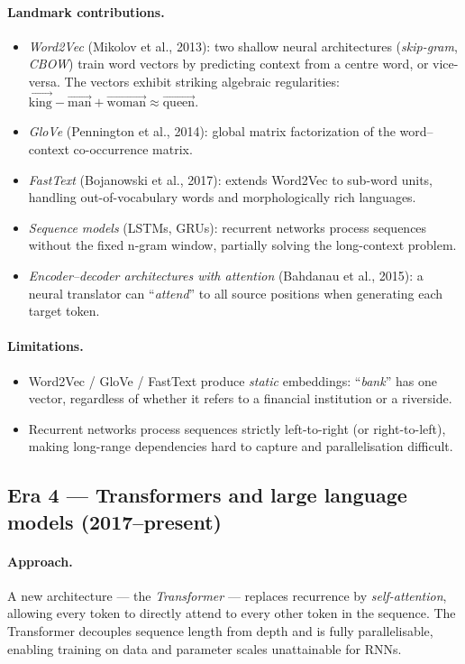 \documentclass[12pt,a4paper]{report}
\theoremstyle{definition}
\theoremstyle{remark}
\begin{document}
\paragraph{Landmark contributions.}
\begin{itemize}
    \item \emph{Word2Vec} (Mikolov et al., 2013): two shallow neural architectures (\emph{skip-gram}, \emph{CBOW}) train word vectors by predicting context from a centre word, or vice-versa. The vectors exhibit striking algebraic regularities: $\overrightarrow{\text{king}} - \overrightarrow{\text{man}} + \overrightarrow{\text{woman}} \approx \overrightarrow{\text{queen}}$.
    \item \emph{GloVe} (Pennington et al., 2014): global matrix factorization of the word--context co-occurrence matrix.
    \item \emph{FastText} (Bojanowski et al., 2017): extends Word2Vec to sub-word units, handling out-of-vocabulary words and morphologically rich languages.
    \item \emph{Sequence models} (LSTMs, GRUs): recurrent networks process sequences without the fixed n-gram window, partially solving the long-context problem.
    \item \emph{Encoder--decoder architectures with attention} (Bahdanau et al., 2015): a neural translator can ``\emph{attend}'' to all source positions when generating each target token.
\end{itemize}

\paragraph{Limitations.}
\begin{itemize}
    \item Word2Vec / GloVe / FastText produce \emph{static} embeddings: ``\emph{bank}'' has one vector, regardless of whether it refers to a financial institution or a riverside.
    \item Recurrent networks process sequences strictly left-to-right (or right-to-left), making long-range dependencies hard to capture and parallelisation difficult.
\end{itemize}

\subsection{Era 4 --- Transformers and large language models (2017--present)}

\paragraph{Approach.} A new architecture --- the \emph{Transformer} --- replaces recurrence by \emph{self-attention}, allowing every token to directly attend to every other token in the sequence. The Transformer decouples sequence length from depth and is fully parallelisable, enabling training on data and parameter scales unattainable for RNNs.
\end{document}
